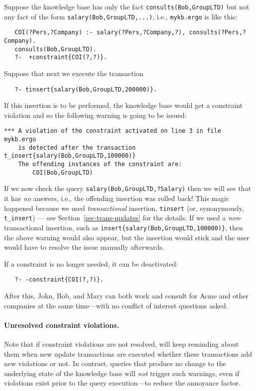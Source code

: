 Suppose the knowledge base has only the fact
\texttt{consults(Bob,GroupLTD)}
but not any fact of the form \texttt{salary(Bob,GroupLTD,...)}, i.e.,
\texttt{mykb.ergo} is like this:
\begin{verbatim}
   COI(?Pers,?Company) :- salary(?Pers,?Company,?), consults(?Pers,?Company).
   consults(Bob,GroupLTD).
   ?-  +constraint{COI(?,?)}.
\end{verbatim}
Suppose that next we execute the transaction
\begin{verbatim}
   ?- tinsert{salary(Bob,GroupLTD,200000)}.
\end{verbatim}
If this insertion is to be performed, the knowledge base would get a
constraint violation
and so the following warning is going to be issued:
\begin{verbatim}
*** A violation of the constraint activated on line 3 in file mykb.ergo
    is detected after the transaction t_insert{salary(Bob,GroupLTD,100000)}
    The offending instances of the constraint are:
        COI(Bob,GroupLTD)
\end{verbatim}
If we now check the query \texttt{salary(Bob,GroupLTD,?Salary)} then we will
see that it has \emph{no} answers,
i.e., the offending insertion was rolled back!
This magic happened because we used \emph{transactional} insertion,
\texttt{tinsert} (or, synonymously, \texttt{t\_insert}) --- see
Section~\ref{sec-trans-updates} for the details.
If we used  a \emph{non}-transactional insertion, such as 
\texttt{insert\{salary(Bob,GroupLTD,100000)\}}, then the above warning would
also appear, but the insertion would stick and the user would
have to resolve the issue manually afterwards.

If a constraint is no longer needed, it can be deactivated:
\begin{verbatim}
   ?- -constraint{COI(?,?)}.
\end{verbatim}
After this, John, Bob, and Mary can both work and consult for Acme and
other companies at the same time---with no conflict of interest questions
asked.

\paragraph{Unresolved constraint violations.}
Note that if constraint violations are not resolved, \ERGO will keep
reminding about them when new update transactions are executed whether
these transactions add new violations or not.
In contrast, queries that produce no change to the underlying state of the
knowledge
base will \emph{not} trigger such warnings, even if violations exist
prior to the query execution---to reduce
the annoyance factor.

